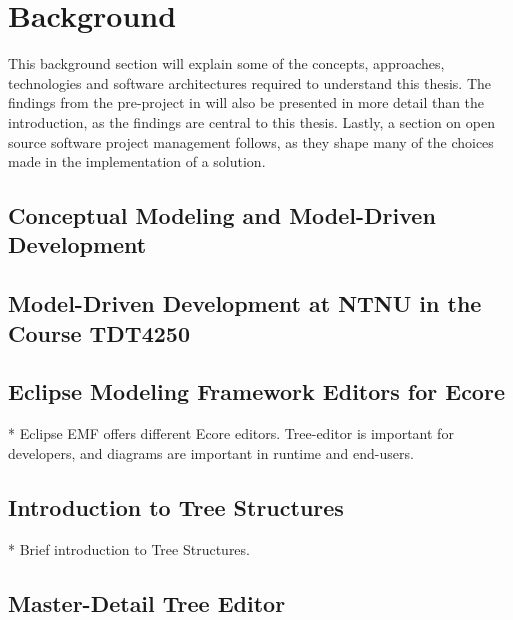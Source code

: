 \chapter{Background}\label{chap:background}

This background section will explain some of the concepts, approaches, technologies and software architectures required to understand this thesis.
The findings from the pre-project in \cite{rekstadModelingEnvironmentCloud2020} will also be presented in more detail than the introduction, as the findings are central to this thesis.
Lastly, a section on open source software project management follows, as they shape many of the choices made in the implementation of a solution.

\section{Conceptual Modeling and Model-Driven Development}\label{sec:conceptual-modeling}




\section{Model-Driven Development at NTNU in the Course TDT4250}\label{sec:tdt4250}




\section{Eclipse Modeling Framework Editors for Ecore}

* Eclipse EMF offers different Ecore editors. Tree-editor is important for developers, and diagrams are important in runtime and end-users.

\section{Introduction to Tree Structures}

* Brief introduction to Tree Structures.

\section{Master-Detail Tree Editor}

